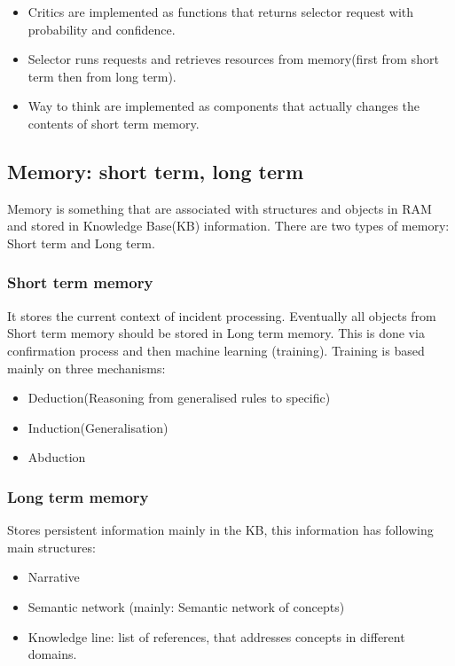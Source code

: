 \documentclass{acm_proc_article-sp}
\begin{document}
\begin{itemize}
  \item Critics are implemented as functions that returns selector request with probability and confidence.
  \item Selector runs requests and retrieves resources from memory(first from short term then from long term).
  \item Way to think are implemented as components that actually changes the contents of short term memory.
\end{itemize}

\subsection{Memory: short term, long term}

Memory is something that are associated with structures and objects in RAM and stored in Knowledge Base(KB) information.
There are two types of memory: Short term and Long term.

\subsubsection{Short term memory}

It stores the current context of incident processing. Eventually all objects from Short term memory should be stored in Long term memory. This is done via confirmation process and then machine learning (training). 
Training is based mainly on three mechanisms:
\begin{itemize}
  \item Deduction(Reasoning from generalised rules to specific)
  \item Induction(Generalisation)
  \item Abduction
\end{itemize}

\subsubsection{Long term memory}

Stores persistent information mainly in the KB, this information has following main structures:

\begin{itemize}
  \item Narrative
  \item Semantic network (mainly: Semantic network of concepts)
  \item Knowledge line: list of references, that addresses concepts in different domains.
\end{itemize}
\end{document}
